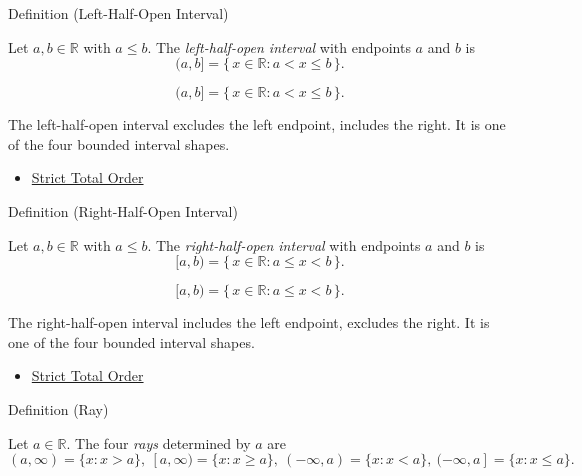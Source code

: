 \begin{definitionbox}{Definition (Left-Half-Open Interval)}
\begin{definition}
\label{def:left-half-open-interval}
Let $a,b\in\mathbb{R}$ with $a\le b$. The \emph{left-half-open interval} with endpoints $a$ and $b$ is
\[
(a,b]=\{\,x\in\mathbb{R} : a<x\le b\,\}.
\]
\end{definition}
\end{definitionbox}
\begin{remark*}
\[
(a,b]=\{\,x\in\mathbb{R} : a<x\le b\,\}.
\]
\end{remark*}
\begin{remark*}[Interpretation]
The left-half-open interval excludes the left endpoint, includes the right. It is one of the four bounded interval shapes.
\end{remark*}
\begin{dependencies}
\begin{itemize}
  \item \hyperref[def:strict-total-order]{Strict Total Order}
\end{itemize}
\end{dependencies}
\begin{definitionbox}{Definition (Right-Half-Open Interval)}
\begin{definition}
\label{def:right-half-open-interval}
Let $a,b\in\mathbb{R}$ with $a\le b$. The \emph{right-half-open interval} with endpoints $a$ and $b$ is
\[
[a,b)=\{\,x\in\mathbb{R} : a\le x<b\,\}.
\]
\end{definition}
\end{definitionbox}
\begin{remark*}
\[
[a,b)=\{\,x\in\mathbb{R} : a\le x<b\,\}.
\]
\end{remark*}
\begin{remark*}[Interpretation]
The right-half-open interval includes the left endpoint, excludes the right. It is one of the four bounded interval shapes.
\end{remark*}
\begin{dependencies}
\begin{itemize}
  \item \hyperref[def:strict-total-order]{Strict Total Order}
\end{itemize}
\end{dependencies}
\begin{definitionbox}{Definition (Ray)}
\begin{definition}[Ray]
\label{def:ray}
Let $a\in\mathbb{R}$. The four \emph{rays} determined by $a$ are
\[
(a,\infty)=\{x:x>a\},\ [a,\infty)=\{x:x\ge a\},\ (-\infty,a)=\{x:x<a\},\ (-\infty,a]=\{x:x\le a\}.
\]
\end{definition}
\end{definitionbox}
